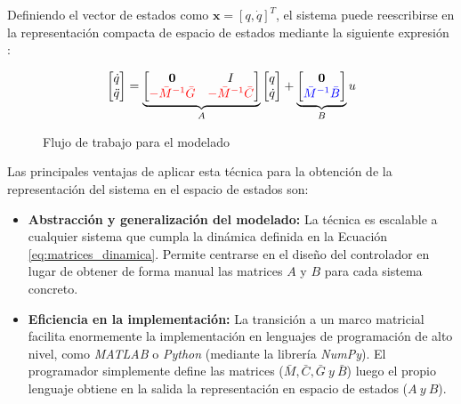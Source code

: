 \documentclass[11pt,fleqn]{book} %
\begin{document}
Definiendo el vector de estados como $\mathbf{x} = [q, \dot{q}]^T$, el sistema puede reescribirse en la representación compacta de espacio de estados mediante la siguiente expresión \cite{Penarrocha_Tema7}:

\begin{equation}
	\begin{bmatrix} \dot{q} \\ \ddot{q} \end{bmatrix} = 
	\underbrace{\begin{bmatrix} 
			\mathbf{0} & I \\ 
			\color{red}{-\bar{M}^{-1}\bar{G}} & \color{red}{-\bar{M}^{-1}\bar{C}} 
	\end{bmatrix}}_{A}
	\begin{bmatrix} q \\ \dot{q} \end{bmatrix} + 
	\underbrace{\begin{bmatrix} \mathbf{0} \\ \color{blue}{\bar{M}^{-1}\bar{B}} \end{bmatrix}}_{B} u
	\label{eq:espacio_estados_bloques}
\end{equation}

\begin{figure}[ht]
	\centering
	\resizebox{\textwidth}{!}{%
		
	}
	\caption{Flujo de trabajo para el modelado}
	\label{fig:modelado_SS}
\end{figure}

Las principales ventajas de aplicar esta técnica para la obtención de la representación del sistema en el espacio de estados son:

\begin{itemize}
	\item \textbf{Abstracción y generalización del modelado:} La técnica es escalable a cualquier sistema que cumpla la dinámica definida en la Ecuación \ref{eq:matrices_dinamica}. Permite centrarse en el diseño del controlador en lugar de obtener de forma manual las matrices $A$ y $B$ para cada sistema concreto. 
	
	\item \textbf{Eficiencia en la implementación:} La transición a un marco matricial facilita enormemente la implementación en lenguajes de programación de alto nivel, como \textit{MATLAB} o \textit{Python} (mediante la librería \textit{NumPy}). El programador simplemente define las matrices ($\bar{M}, \bar{C}, \bar{G}\ y\ \bar{B}$) luego el propio lenguaje obtiene en la salida la representación en espacio de estados ($A\ y \ B$). 
\end{itemize}
\end{document}
